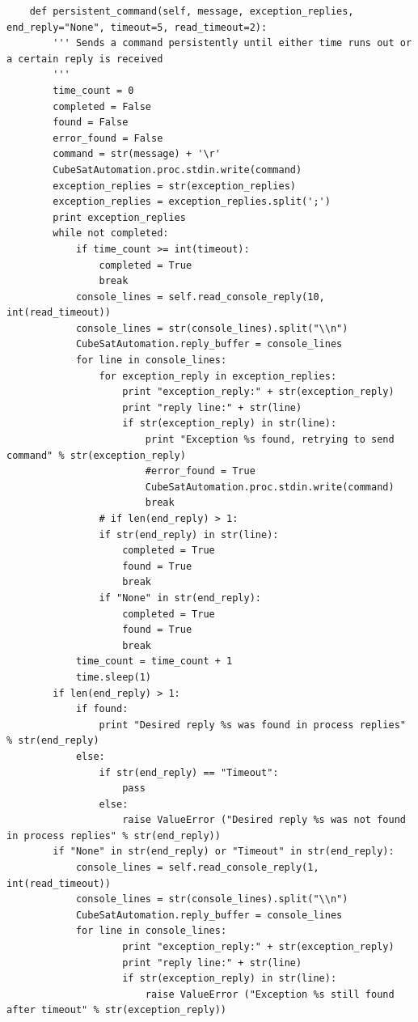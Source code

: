 \documentclass[english,12pt,a4paper,pdftex,elec,utf8]{aaltothesis}
\begin{document}
\begin{verbatim}
	def persistent_command(self, message, exception_replies, end_reply="None", timeout=5, read_timeout=2):
		''' Sends a command persistently until either time runs out or a certain reply is received
 		'''
		time_count = 0
		completed = False
		found = False
		error_found = False
		command = str(message) + '\r'
		CubeSatAutomation.proc.stdin.write(command)
		exception_replies = str(exception_replies)
		exception_replies = exception_replies.split(';')
		print exception_replies
		while not completed:
			if time_count >= int(timeout):
				completed = True
				break        
			console_lines = self.read_console_reply(10, int(read_timeout))
			console_lines = str(console_lines).split("\\n")
			CubeSatAutomation.reply_buffer = console_lines
			for line in console_lines:
				for exception_reply in exception_replies:
					print "exception_reply:" + str(exception_reply)
					print "reply line:" + str(line)
					if str(exception_reply) in str(line):
						print "Exception %s found, retrying to send command" % str(exception_reply)
						#error_found = True
						CubeSatAutomation.proc.stdin.write(command)
						break
				# if len(end_reply) > 1:
				if str(end_reply) in str(line):
					completed = True
					found = True
					break
				if "None" in str(end_reply):
					completed = True
					found = True
					break
			time_count = time_count + 1
			time.sleep(1)
		if len(end_reply) > 1:
			if found:
				print "Desired reply %s was found in process replies" % str(end_reply)
			else:
				if str(end_reply) == "Timeout":
					pass
				else:
					raise ValueError ("Desired reply %s was not found in process replies" % str(end_reply))
		if "None" in str(end_reply) or "Timeout" in str(end_reply):
			console_lines = self.read_console_reply(1, int(read_timeout))
			console_lines = str(console_lines).split("\\n")
			CubeSatAutomation.reply_buffer = console_lines			
			for line in console_lines:
					print "exception_reply:" + str(exception_reply)
					print "reply line:" + str(line)
					if str(exception_reply) in str(line):
						raise ValueError ("Exception %s still found after timeout" % str(exception_reply)) 				
\end{verbatim}



\clearpage
\end{document}
